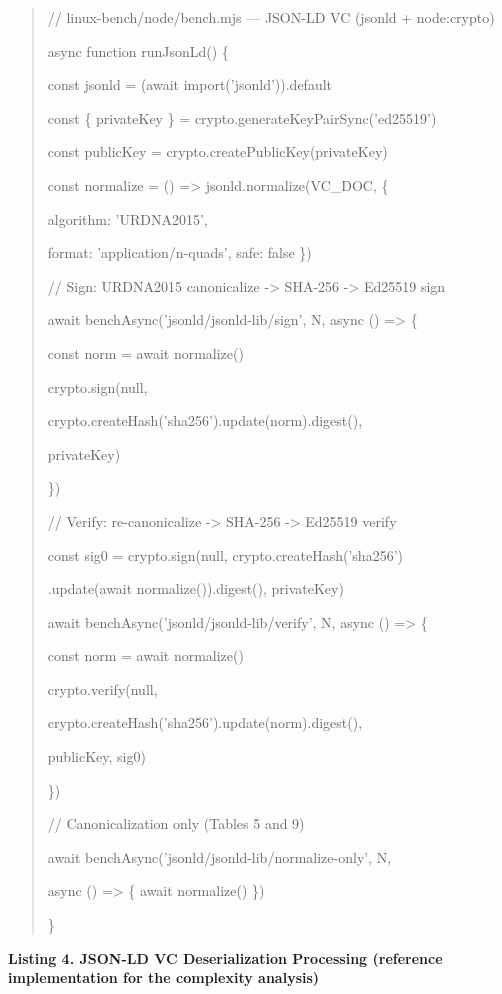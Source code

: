\documentclass[conference]{IEEEtran}
\begin{document}
\begin{quote}
// linux-bench/node/bench.mjs --- JSON-LD VC (jsonld + node:crypto)

async function runJsonLd() \{

const jsonld = (await import('jsonld')).default

const \{ privateKey \} = crypto.generateKeyPairSync('ed25519')

const publicKey = crypto.createPublicKey(privateKey)

const normalize = () =\textgreater{} jsonld.normalize(VC\_DOC, \{

algorithm: 'URDNA2015',

format: 'application/n-quads', safe: false \})

// Sign: URDNA2015 canonicalize -\textgreater{} SHA-256 -\textgreater{} Ed25519 sign

await benchAsync('jsonld/jsonld-lib/sign', N, async () =\textgreater{} \{

const norm = await normalize()

crypto.sign(null,

crypto.createHash('sha256').update(norm).digest(),

privateKey)

\})

// Verify: re-canonicalize -\textgreater{} SHA-256 -\textgreater{} Ed25519 verify

const sig0 = crypto.sign(null, crypto.createHash('sha256')

.update(await normalize()).digest(), privateKey)

await benchAsync('jsonld/jsonld-lib/verify', N, async () =\textgreater{} \{

const norm = await normalize()

crypto.verify(null,

crypto.createHash('sha256').update(norm).digest(),

publicKey, sig0)

\})

// Canonicalization only (Tables 5 and 9)

await benchAsync('jsonld/jsonld-lib/normalize-only', N,

async () =\textgreater{} \{ await normalize() \})

\}
\end{quote}

\textbf{Listing 4. JSON-LD VC Deserialization Processing (reference implementation for the complexity analysis)}
\end{document}
